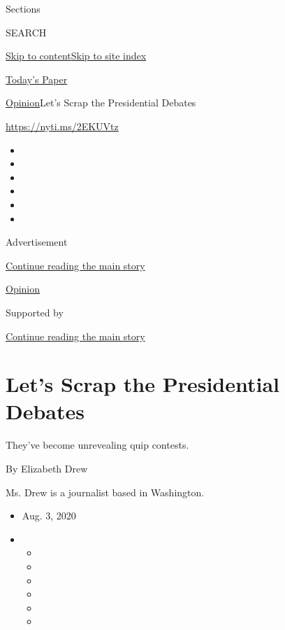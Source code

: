 Sections

SEARCH

\protect\hyperlink{site-content}{Skip to
content}\protect\hyperlink{site-index}{Skip to site index}

\href{https://myaccount.nytimes3xbfgragh.onion/auth/login?response_type=cookie\&client_id=vi}{}

\href{https://www.nytimes3xbfgragh.onion/section/todayspaper}{Today's
Paper}

\href{/section/opinion}{Opinion}\textbar{}Let's Scrap the Presidential
Debates

\url{https://nyti.ms/2EKUVtz}

\begin{itemize}
\item
\item
\item
\item
\item
\item
\end{itemize}

Advertisement

\protect\hyperlink{after-top}{Continue reading the main story}

\href{/section/opinion}{Opinion}

Supported by

\protect\hyperlink{after-sponsor}{Continue reading the main story}

\hypertarget{lets-scrap-the-presidential-debates}{%
\section{Let's Scrap the Presidential
Debates}\label{lets-scrap-the-presidential-debates}}

They've become unrevealing quip contests.

By Elizabeth Drew

Ms. Drew is a journalist based in Washington.

\begin{itemize}
\item
  Aug. 3, 2020
\item
  \begin{itemize}
  \item
  \item
  \item
  \item
  \item
  \item
  \end{itemize}
\end{itemize}

